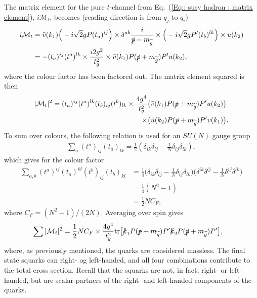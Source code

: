 \documentclass[twoside,english]{uiofysmaster}
\begin{document}
{The matrix element for the pure $t$-channel from Eq.~(\ref{Eq:: susy hadron : matrix element}), $i\mathcal{M}_t$, becomes (reading direction is from $q_j$ to $q_i$)
\begin{align*}
i \mathcal{M}_t &= \bar{v} (k_1) \Big( -i \sqrt{2} g P (t_a)^{ij}\Big) \times \delta^{ab} \frac{i}{\slashed{p} - m_{\widetilde{g}}} \times \Big( -i \sqrt{2} gP'(t_b)^{lk} \Big) \times u(k_2)\\
&= - (t_a)^{ij}(t^a)^{lk} \times \frac{i 2 g^2}{t_g^2} \times  \bar{v} (k_1)  P (\slashed{p} + m_{\widetilde{g}}) P' u(k_2) ,
\end{align*}
where the colour factor has been factored out. The matrix element squared is then
\begin{align*}
|\mathcal{M}_t|^2 =  (t_a)^{ij} (t^a)^{lk} (t_b)_{ij} (t^b)_{lk} \times \frac{4 g^4}{t_g^2}&
\big( \bar{v} (k_1)  P (\slashed{p} + m_{\widetilde{g}}) P' u(k_2) \big)
\\ \times &\big( \bar{u} (k_2)  P (\slashed{p} + m_{\widetilde{g}}) P' v(k_1) \big).
\end{align*}
To sum over colours, the following relation is used for an $SU(N)$ gauge group \cite{Ellis:1991qj}
\begin{align}\label{Eq:: susy hadron : color factor identity}
\sum_a (t^a)_{ij} (t_a)_{lk} = \frac{1}{2} (\delta_{ik} \delta_{lj} - \frac{1}{N} \delta_{ij} \delta_{lk}),
\end{align}
which gives for the colour factor
\begin{align*}
\sum_{a,b} (t^a)^{ij}(t_a)^{kl}(t^b)_{ij}(t_b)_{kl} &= \frac{1}{4} 
\big(\delta_{ik} \delta_{lj} - \frac{1}{N} \delta_{ij} \delta_{lk} \big)
\big(\delta^{ik} \delta^{lj} - \frac{1}{N} \delta^{ij} \delta^{lk} \big)\\& = \frac{1}{4} (N^2 - 1)\\& = \frac{1}{2}NC_F,
\end{align*}
where $C_F = (N^2 - 1)/(2N)$. Averaging over spin gives
\begin{align*}
\sum |\mathcal{M}_t|^2 &= \frac{1}{2} NC_F \times \frac{4 g^4}{t_g^2} \text{tr} \big[ 
\slashed{k}_1 P (\slashed{p} + m_{\widetilde{g}}) P' \slashed{k}_2 P (\slashed{p} + m_{\widetilde{g}}) P' \big],
\end{align*}
where, as previously mentioned, the quarks are considered massless. The final state squarks can right- og left-handed, and all four combinations contribute to the total cross section. Recall that the squarks are not, in fact, right- or left-handed, but are scalar partners of the right- and left-handed components of the quarks. 

}
\end{document}
